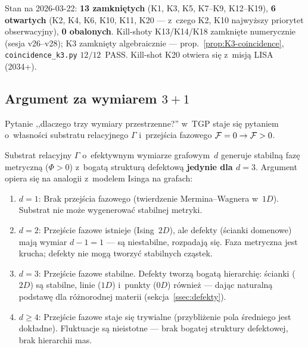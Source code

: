 \begin{remark}\label{rem:killshot-bilans}
Stan na 2026-03-22: \textbf{13 zamkni\k{e}tych}
(K1, K3, K5, K7--K9, K12--K19),
\textbf{6 otwartych} (K2, K4, K6, K10, K11, K20 --- z~czego K2, K10
najwy\.zszy priorytet obserwacyjny), \textbf{0 obalonych}.
Kill-shoty K13/K14/K18 zamkni\k{e}te numerycznie (sesja v26--v28);
K3 zamkni\k{e}ty algebraicznie --- prop.~\ref{prop:K3-coincidence},
\texttt{coincidence\_k3.py} $12/12$~PASS.
Kill-shot K20 otwiera si\k{e} z~misj\k{a} LISA (2034+).
\end{remark}

\subsection{Argument za wymiarem $3{+}1$}\label{ssec:wymiar}

Pytanie ,,dlaczego trzy wymiary przestrzenne?'' w~TGP staje
si\k{e} pytaniem o~w\l{}asno\'sci substratu relacyjnego $\Gamma$
i~przej\'scia fazowego $\mathcal{F} = 0 \to \mathcal{F} > 0$.

\begin{proposition}[Wymiar $d = 3$ jako optymalny
  dla TGP]\label{prop:wymiar}
Substrat relacyjny $\Gamma$ o~efektywnym wymiarze grafowym~$d$
generuje stabiln\k{a} faz\k{e} metryczn\k{a} ($\Phi > 0$)
z~bogat\k{a} struktur\k{a} defektow\k{a} \textbf{jedynie
dla $d = 3$}. Argument opiera si\k{e} na analogii z~modelem
Isinga na grafach:
\begin{enumerate}[nosep]
  \item \textbf{$d = 1$}: Brak przej\'scia fazowego
        (twierdzenie Mermina--Wagnera w~$1D$).
        Substrat nie mo\.ze wygenerowa\'c stabilnej metryki.
  \item \textbf{$d = 2$}: Przej\'scie fazowe istnieje
        (Ising~$2D$), ale defekty (\'scianki domenowe)
        maj\k{a} wymiar $d{-}1 = 1$ --- s\k{a} niestabilne,
        rozpadaj\k{a} si\k{e}. Faza metryczna jest krucha;
        defekty nie mog\k{a} tworzy\'c stabilnych cz\k{a}stek.
  \item \textbf{$d = 3$}: Przej\'scie fazowe stabilne.
        Defekty tworz\k{a} bogat\k{a} hierarchi\k{e}:
        \'scianki ($2D$) s\k{a} stabilne, linie ($1D$) i~punkty
        ($0D$) r\'ownie\.z --- daj\k{a}c naturaln\k{a}
        podstaw\k{e} dla r\'o\.znorodnej materii
        (sekcja~\ref{ssec:defekty}).
  \item \textbf{$d \geq 4$}: Przej\'scie fazowe staje si\k{e}
        trywialne (przybli\.zenie pola \'sredniego jest
        dok\l{}adne). Fluktuacje s\k{a} nieistotne ---
        brak bogatej struktury defektowej, brak hierarchii mas.
\end{enumerate}
\end{proposition}

